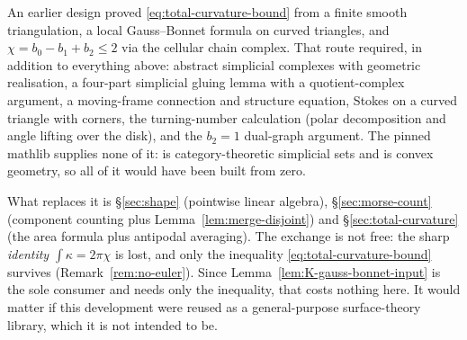 \begin{fnote}\label{fnote:why-degree}
An earlier design proved \eqref{eq:total-curvature-bound} from a finite smooth
triangulation, a local Gauss--Bonnet formula on curved triangles, and
$\chi=b_0-b_1+b_2\le2$ via the cellular chain complex.  That route required,
in addition to everything above: abstract simplicial complexes with geometric
realisation, a four-part simplicial gluing lemma with a quotient-complex
argument, a moving-frame connection and structure equation, Stokes on a curved
triangle with corners, the turning-number calculation (polar decomposition and
angle lifting over the disk), and the $b_2=1$ dual-graph argument.  The pinned
mathlib supplies none of it:  is
category-theoretic simplicial sets and
 is convex geometry, so all of it
would have been built from zero.

What replaces it is \S\ref{sec:shape} (pointwise linear algebra),
\S\ref{sec:morse-count} (component counting plus
Lemma~\ref{lem:merge-disjoint}) and \S\ref{sec:total-curvature} (the area
formula plus antipodal averaging).  The exchange is not free: the sharp
\emph{identity} $\int\kappa=2\pi\chi$ is lost, and only the inequality
\eqref{eq:total-curvature-bound} survives
(Remark~\ref{rem:no-euler}).  Since
Lemma~\ref{lem:K-gauss-bonnet-input} is the sole consumer and needs only the
inequality, that costs nothing here.  It would matter if this development were
reused as a general-purpose surface-theory library, which it is not intended
to be.
\end{fnote}

